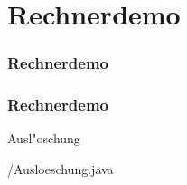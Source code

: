 \def\stitle{Rechnerdemo}
\section{\stitle}
\begin{frame}
    \frametitle{\stitle}%
\tableofcontents[current]
\end{frame}

\begin{frame}[fragile]%
  \frametitle{\stitle}%
\medskip

Ausl"oschung

{\getexercisefolder/Ausloeschung.java}
\end{frame}
